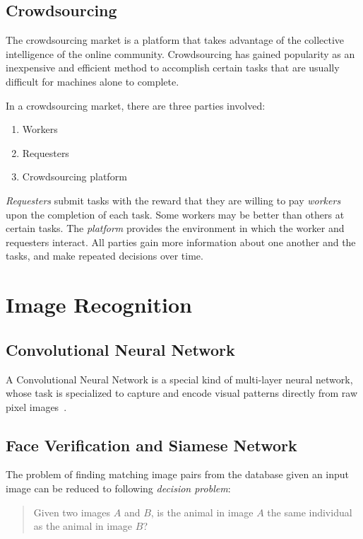 \subsection{Crowdsourcing}

The crowdsourcing market is a platform that takes advantage of the collective intelligence
of the online community. Crowdsourcing has gained popularity as an inexpensive
and efficient method to accomplish certain tasks that are usually difficult for
machines alone to complete.

In a crowdsourcing market, there are three parties involved:
\begin{enumerate}
	\item Workers
	\item Requesters
	\item Crowdsourcing platform
\end{enumerate}

\emph{Requesters} submit tasks with the reward that they are
willing to pay \emph{workers} upon the completion of each task. Some workers
may be better than others at certain tasks. The \emph{platform} provides the
environment in which the worker and requesters interact. All parties gain more
information about one another and the tasks, and make repeated decisions
over time.

\section{Image Recognition}

\subsection{Convolutional Neural Network}

A Convolutional Neural Network is a special kind of multi-layer neural network,
whose task is specialized to capture and encode visual patterns directly from
raw pixel images~\cite{lecun95}.

\subsection{Face Verification and Siamese Network}

The problem of finding matching image pairs from the database given an input
image can be reduced to following \emph{decision problem}:
\begin{quote}
\centering
Given two images $A$ and $B$, is the animal in image $A$ the same individual as the
animal in image $B$?
\end{quote}

